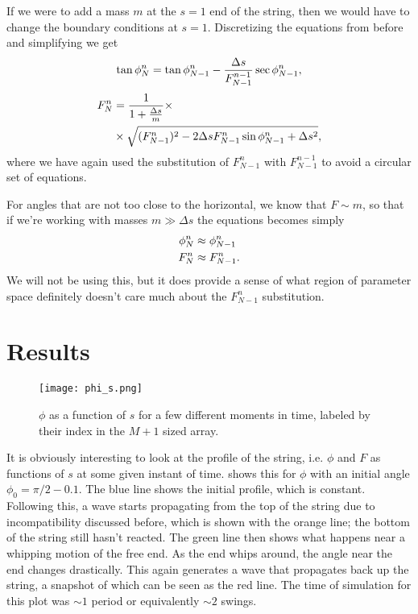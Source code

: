 \documentclass[10pt,a4paper,twocolumn]{article}
\begin{document}
If we were to add a mass $m$ at the $s=1$ end of the string, then we would have to change the boundary conditions at $s=1$. Discretizing the equations from before and simplifying we get
%
\begin{align}
    \tan \phi_N^n = \tan \phi_{N-1}^n - \frac{\Delta s}{F_{N-1}^{n-1}} \sec \phi_{N-1}^n,\notag
\end{align}
\vspace{-1.7em}
\begin{align}
    F_N^n  &= \frac{1}{1 + \frac{\Delta s}{m}} \times\notag\\
    &\times \sqrt{(F_{N-1}^n)^2 - 2 \Delta s F_{N-1}^n \sin \phi_{N-1}^n + \Delta s^2},
\end{align}
%
where we have again used the substitution of $F_{N-1}^n$ with $F_{N-1}^{n-1}$ to avoid a circular set of equations.

For angles that are not too close to the horizontal, we know that $F \sim m$, so that if we're working with masses $m \gg \Delta s$ the equations becomes simply
%
\begin{align}
    \phi_N^n &\approx \phi_{N-1}^n\notag\\
    F_N^n &\approx F_{N-1}^n.
\end{align}
%
We will not be using this, but it does provide a sense of what region of parameter space definitely doesn't care much about the $F_{N-1}^n$ substitution.


\section{Results}

\begin{figure}[!b]
    \centering
    \texttt{[image: phi\_s.png]}
    \caption{$\phi$ as a function of $s$ for a few different moments in time, labeled by their index in the $M+1$ sized array.}
    \label{fig:phi_s}
\end{figure}

It is obviously interesting to look at the profile of the string, i.e. $\phi$ and $F$ as functions of $s$ at some given instant of time.  shows this for $\phi$ with an initial angle $\phi_0 = \pi / 2 - 0.1$. The blue line shows the initial profile, which is constant. Following this, a wave starts propagating from the top of the string due to incompatibility discussed before, which is shown with the orange line; the bottom of the string still hasn't reacted. The green line then shows what happens near a whipping motion of the free end. As the end whips around, the angle near the end changes drastically. This again generates a wave that propagates back up the string, a snapshot of which can be seen as the red line. The time of simulation for this plot was $\sim\!1$ period or equivalently $\sim\!2$ swings.
\end{document}
